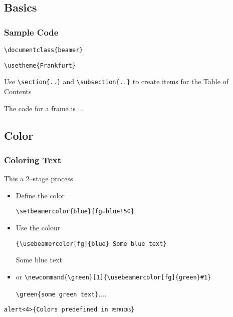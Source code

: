 \subsection{Basics}
\begin{frame}[fragile]
  \frametitle{Sample Code}
\verb+\documentclass{beamer}+
  
\verb+\usetheme{Frankfurt}+

  Use \verb+\section{..}+  and \verb+\subsection{..}+ to
create items for the Table of Contents

\alert<1>{The code for a frame is ...}
\end{frame}

\subsection{Color}

\begin{frame}[fragile]
  \frametitle{Coloring Text}
This a 2--stage process
\begin{itemize}
\item {\red Define} {\green the} {\blue color}

\verb+\setbeamercolor{blue}{fg=blue!50}+\pause
\item Use the colour

\verb+{\usebeamercolor[fg]{blue} Some blue text}+

	{ Some blue text}
\pause
\item or
{\small\verb+\newcommand{\green}[1]{\usebeamercolor[fg]{green}#1}+}

\verb+\green{some green text}+....

\end{itemize}

\alert<4>{\texttt{\bs alert<4>\{Colors predefined in \textsc{pstricks}\}}}
\end{frame}

